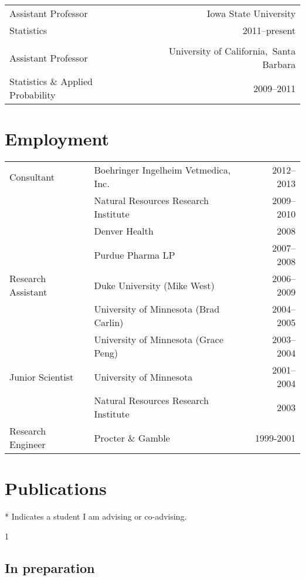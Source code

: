 \documentclass[overlapped,line]{res}
\providecommand{\includeinprep}{1}
\begin{document}
\begin{resume}
\begin{tabular}{l@{\qquad}r}
Assistant Professor & Iowa State University \\
Statistics & 2011--present \\
\\
Assistant Professor & University of California,\ Santa Barbara \\
Statistics \& Applied Probability & 2009--2011
\end{tabular}


\section{\bf Employment}

\begin{tabular}{l@{\qquad}l@{\qquad}r}
Consultant & Boehringer Ingelheim Vetmedica, Inc. & 2012--2013 \\
 & Natural Resources Research Institute  & 2009--2010 \\
 & Denver Health & 2008 \\
 & Purdue Pharma LP & 2007--2008 \\
Research Assistant & Duke University (Mike West) & 2006--2009 \\
 & University of Minnesota (Brad Carlin) & 2004--2005 \\
 & University of Minnesota (Grace Peng) & 2003--2004 \\
Junior Scientist & University of Minnesota & 2001--2004 \\
 & Natural Resources Research Institute & 2003 \\
Research Engineer & Procter \& Gamble & 1999-2001
\end{tabular}


\section{Publications}

* Indicates a student I am advising or co-advising.

\vspace{-0.3in}

\includeinprep
\subsection{\bf In preparation} \vspace{-0.2in}


\end{resume}
\end{document}
